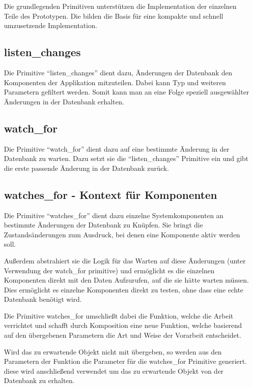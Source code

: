 Die grundlegenden Primitiven unterstützen die Implementation der einzelnen Teile des Prototypen. Die bilden die Basis für eine kompakte und schnell umzusetzende Implementation.

\subsection{listen\_changes}

Die Primitive ``listen\_changes'' dient dazu,
Änderungen der Datenbank den Komponenten der Applikation mitzuteilen.
Dabei kann Typ und weiteren Parametern gefiltert werden.
Somit kann man an eine Folge speziell ausgewählter Änderungen in der Datenbank erhalten.

\subsection{watch\_for}

Die Primitive ``watch\_for'' dient dazu auf eine bestimmte Änderung in der Datenbank zu warten. Dazu setzt sie die ``listen\_changes'' Primitive ein und gibt die erste passende Änderung in der Datenbank zurück.

\subsection{watches\_for - Kontext für Komponenten}

Die Primitive ``watches\_for'' dient dazu einzelne Systemkomponenten
an bestimmte Änderungen der Datenbank zu Knüpfen.
Sie bringt die Zustandsänderungen zum Ausdruck,
bei denen eine Komponente aktiv werden soll.

Außerdem abstrahiert sie die Logik für das Warten auf diese Änderungen
(unter Verwendung der watch\_for primitive)
und ermöglicht es die einzelnen Komponenten direkt mit den Daten Aufzurufen,
auf die sie hätte warten müssen.
Dies ermöglicht es einzelne Komponenten direkt zu testen, ohne dass eine echte Datenbank benötigt wird.

Die Primitive watches\_for umschließt dabei die Funktion, welche die Arbeit verrichtet und schafft durch Komposition eine neue Funktion,
welche basierend auf den übergebenen Parametern die Art und Weise der Vorarbeit entscheidet.

Wird das zu erwartende Objekt nicht mit übergeben, so werden aus den Parametern der Funktion die Parameter für die watches\_for Primitive generiert.
diese wird anschließend verwendet um das zu erwartende Objekt von der Datenbank zu erhalten.



